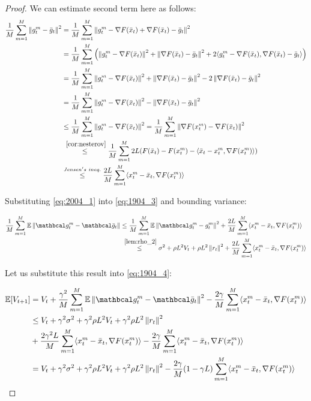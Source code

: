 \begin{proof}
    We can estimate second term here as follows:
    \begin{align}
        \fsumm{m=1}{M} \norm{g^m_t - \bar{g}_t}^2 
        &=
        \fsumm{m=1}{M} \norm{g^m_t - \nabla F(\bar{x}_t) + \nabla F(\bar{x}_t) - \bar{g}_t}^2 \\
        &=
        \fsumm{m=1}{M} \left( \norm{g^m_t - \nabla F(\bar{x}_t)}^2 + \norm{\nabla F(\bar{x}_t) - \bar{g}_t}^2 + 2 \inner{g^m_t - \nabla F(\bar{x}_t)}{\nabla F(\bar{x}_t) - \bar{g}_t} \right) \\
        &= 
        \fsumm{m=1}{M} \norm{g^m_t - \nabla F(\bar{x}_t)}^2 + \norm{\nabla F(\bar{x}_t) - \bar{g}_t}^2 - 2 \norm{\nabla F(\bar{x}_t) - \bar{g}_t}^2 \\
        &= 
        \fsumm{m=1}{M} \norm{g^m_t - \nabla F(\bar{x}_t)}^2 - \norm{\nabla F(\bar{x}_t) - \bar{g}_t}^2 \\
        &\leq 
        \fsumm{m=1}{M} \norm{g^m_t - \nabla F(\bar{x}_t)}^2
        =
        \fsumm{m=1}{M} \norm{\nabla F(x^m_t) - \nabla F(\bar{x}_t)}^2 \\
        &\overset{~\ref{cor:nesterov}}{\leq}
        \fsumm{m=1}{M} 2L (F(\bar{x}_t) - F(x^m_t) - \inner{\bar{x}_t - x^m_t}{\nabla F(x^m_t)}) \\
        &\overset{Jensen's \ ineq.}{\leq}
        \frac{2L}{M} \summ{m=1}{M} \inner{x^m_t - \bar{x}_t}{\nabla F(x^m_t)}
        \label{eq:2004_1}
    \end{align}

    Substituting \eqref{eq:2004_1} into \eqref{eq:1904_3} and bounding variance:

    \begin{align}
        \fsumm{m=1}{M} \E \norm{\mc{g}^m_t - \mc{\bar{g}}_t} 
        &\leq
        \fsumm{m=1}{M} \E \norm{\mc{g}^m_t - g^m_t}^2 
        +
        \frac{2L}{M} \summ{m=1}{M} \inner{x^m_t - \bar{x}_t}{\nabla F(x^m_t)} \\
        &\overset{~\ref{lem:rho_2}}{\leq}
        \sigma^2 + \rho L^2 V_t + \rho L^2 \norm{r_t}^2
        +
        \frac{2L}{M} \summ{m=1}{M} \inner{x^m_t - \bar{x}_t}{\nabla F(x^m_t)}
    \end{align}

    Let us substitute this result into \eqref{eq:1904_4}:

    \begin{align}
        \E [V_{t+1}] 
        &=
        V_t + \frac{\gamma^2}{M} \summ{m=1}{M} \E \norm{\mc{g}^m_t - \mc{\bar{g}}_t}^2 - \frac{2\gamma}{M} \summ{m=1}{M} \inner{x^m_t - \bar{x}_t}{\nabla F(x^m_t)} \\
        &\leq 
        V_t 
        + \gamma^2 \sigma^2 + \gamma^2 \rho L^2 V_t + \gamma^2 \rho L^2 \norm{r_t}^2
        \\
        &+\frac{2 \gamma^2 L}{M} \summ{m=1}{M} \inner{x^m_t - \bar{x}_t}{\nabla F(x^m_t)}
        - \frac{2\gamma}{M} \summ{m=1}{M} \inner{x^m_t - \bar{x}_t}{\nabla F(x^m_t)} \\
        &=
        V_t 
        + \gamma^2 \sigma^2 + \gamma^2 \rho L^2 V_t + \gamma^2 \rho L^2 \norm{r_t}^2
        - \frac{2\gamma}{M}(1 - \gamma L) \summ{m=1}{M} \inner{x^m_t - \bar{x}_t}{\nabla F(x^m_t)}
        \label{eq:1904_5}
    \end{align}


\end{proof}
